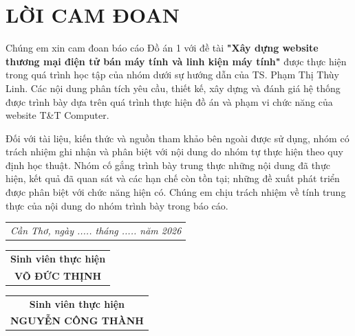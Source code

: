 \chapter*{LỜI CAM ĐOAN}
\vspace{-15pt} %
Chúng em xin cam đoan báo cáo Đồ án 1 với đề tài \textbf{"Xây dựng website thương mại điện tử bán máy tính và linh kiện máy tính"} được thực hiện trong quá trình học tập của nhóm dưới sự hướng dẫn của TS. Phạm Thị Thùy Linh. Các nội dung phân tích yêu cầu, thiết kế, xây dựng và đánh giá hệ thống được trình bày dựa trên quá trình thực hiện đồ án và phạm vi chức năng của website T\&T Computer.

Đối với tài liệu, kiến thức và nguồn tham khảo bên ngoài được sử dụng, nhóm có trách nhiệm ghi nhận và phân biệt với nội dung do nhóm tự thực hiện theo quy định học thuật. Nhóm cố gắng trình bày trung thực những nội dung đã thực hiện, kết quả đã quan sát và các hạn chế còn tồn tại; những đề xuất phát triển được phân biệt với chức năng hiện có. Chúng em chịu trách nhiệm về tính trung thực của nội dung do nhóm trình bày trong báo cáo.

\vfill %

\noindent\hfill
\begin{tabular}{@{}c@{}}
    \textit{Cần Thơ, ngày ..... tháng ..... năm 2026}
\end{tabular}

\vspace{0.2cm}

\noindent
\begin{tabular}{@{}c@{}}
    \textbf{Sinh viên thực hiện} \\[2cm]
    \textbf{VÕ ĐỨC THỊNH}
\end{tabular}
\hfill
\begin{tabular}{@{}c@{}}
    \textbf{Sinh viên thực hiện} \\[2cm]
    \textbf{NGUYỄN CÔNG THÀNH}
\end{tabular}
